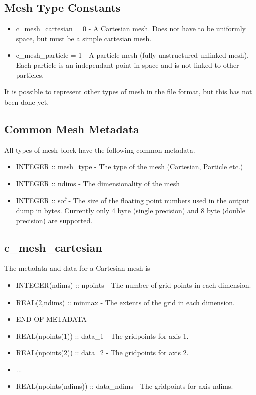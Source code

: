 \documentclass[8pt]{article} \usepackage{url,graphicx,tabularx,array}
\begin{document}
\subsection{Mesh Type Constants}
\begin{itemize}
\item c\_mesh\_cartesian = 0 - A Cartesian mesh. Does not have to be uniformly
  space, but must be a simple cartesian mesh.
\item c\_mesh\_particle = 1 - A particle mesh (fully unstructured unlinked
  mesh). Each particle is an independant point in space and is not linked to
  other particles.
\end{itemize}

It is possible to represent other types of mesh in the file format, but this
has not been done yet.

\subsection{Common Mesh Metadata}

All types of mesh block have the following common metadata.
\begin{itemize}
\item INTEGER :: mesh\_type - The type of the mesh (Cartesian, Particle etc.)
\item INTEGER :: ndims - The dimensionality of the mesh
\item INTEGER :: sof - The size of the floating point numbers used in the
  output dump in bytes. Currently only 4 byte (single precision) and 8 byte
  (double precision) are supported.
\end{itemize}

\subsection{c\_mesh\_cartesian}

The metadata and data for a Cartesian mesh is
\begin{itemize}
\item INTEGER(ndims) :: npoints - The number of grid points in each dimension.
\item REAL(2,ndims) :: minmax - The extents of the grid in each dimension.
\item END OF METADATA
\item REAL(npoints(1)) :: data\_1 - The gridpoints for axis 1.
\item REAL(npoints(2)) :: data\_2 - The gridpoints for axis 2.
\item ...
\item REAL(npoints(ndims)) :: data\_ndims - The gridpoints for axis ndims.
\end{itemize}
\end{document}
